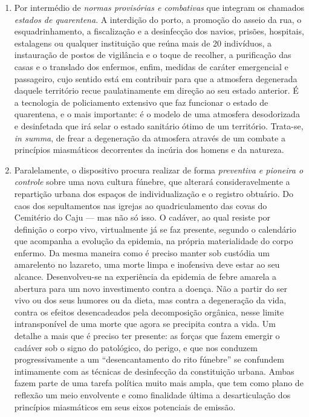 \begin{enumerate}
\def\labelenumi{\arabic{enumi}.}
\item
  Por intermédio de \textit{normas provisórias e combativas} que integram
  os chamados \textit{estados de quarentena}. A interdição do porto, a
  promoção do asseio da rua, o esquadrinhamento, a fiscalização e a
  desinfecção dos navios, prisões, hospitais, estalagens ou qualquer
  instituição que reúna mais de 20 indivíduos, a instauração de postos
  de vigilância e o toque de recolher, a purificação das casas e o
  translado dos enfermos, enfim, medidas de caráter emergencial e
  passageiro, cujo sentido está em contribuir para que a atmosfera
  degenerada daquele território recue paulatinamente em direção ao seu
  estado anterior. É a tecnologia de policiamento extensivo que faz
  funcionar o estado de quarentena, e o mais importante: é o modelo de
  uma atmosfera desodorizada e desinfetada que irá selar o estado
  sanitário ótimo de um território. Trata-se, \textit{in summa}, de frear
  a degeneração da atmosfera através de um combate a princípios
  miasmáticos decorrentes da incúria dos homens e da natureza.
\item
  Paralelamente, o dispositivo procura realizar de forma
  \textit{preventiva e pioneira o controle} sobre uma nova cultura
  fúnebre, que alterará consideravelmente a repartição urbana dos
  espaços de individualização e o registro obtuário. Do caos dos
  sepultamentos nas igrejas ao quadriculamento das covas do Cemitério do
  Caju --- mas não só isso. O cadáver, ao qual resiste por definição o
  corpo vivo, virtualmente já se faz presente, segundo o calendário que
  acompanha a evolução da epidemia, na própria materialidade do corpo
  enfermo. Da mesma maneira como é preciso manter sob custódia um
  amarelento no lazareto, uma morte limpa e inofensiva deve estar ao seu
  alcance. Desenvolveu-se na experiência da epidemia de febre amarela a
  abertura para um novo investimento contra a doença. Não a partir do
  ser vivo ou dos seus humores ou da dieta, mas contra a degeneração da
  vida, contra os efeitos desencadeados pela decomposição orgânica,
  nesse limite intransponível de uma morte que agora se precipita contra
  a vida. Um detalhe a mais que é preciso ter presente: as forças que
  fazem emergir o cadáver sob o signo do patológico, do perigo, e que
  nos conduzem progressivamente a um ``desencantamento do rito fúnebre''
  se confundem intimamente com as técnicas de desinfecção da
  constituição urbana. Ambas fazem parte de uma tarefa política muito
  mais ampla, que tem como plano de reflexão um meio envolvente e como
  finalidade última a desarticulação dos princípios miasmáticos em seus
  eixos potenciais de emissão.
\end{enumerate}

